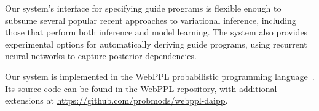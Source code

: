 Our system's interface for specifying guide programs is flexible enough to subsume several popular recent approaches to variational inference, including those that perform both inference and model learning. The system also provides experimental options for automatically deriving guide programs, using recurrent neural networks to capture posterior dependencies.~

Our system is implemented in the WebPPL probabilistic programming language~\cite{WebPPL}. Its source code can be found in the WebPPL repository, with additional extensions at \url{https://github.com/probmods/webppl-daipp}.